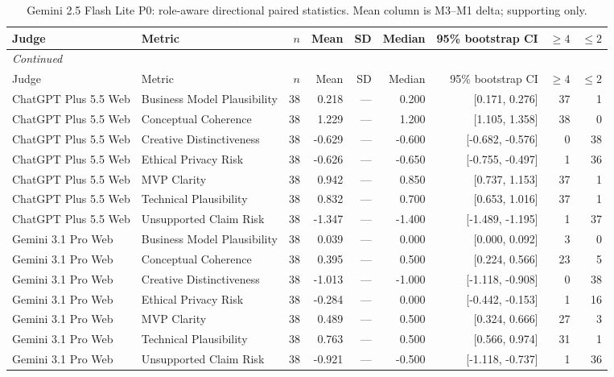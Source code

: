 \documentclass[10pt]{article}
\begin{document}
\begin{landscape}
\small
\begin{longtable}{llrrrrrrr}
\caption{Gemini 2.5 Flash Lite P0: role-aware directional paired statistics. Mean column is M3--M1 delta; supporting only.}\label{tab:s7-dir25p0}\\
\toprule
Judge & Metric & $n$ & Mean & SD & Median & 95\% bootstrap CI & $\geq4$ & $\leq2$ \\
\midrule\endfirsthead
\multicolumn{9}{l}{\small\itshape Continued}\\
\toprule Judge & Metric & $n$ & Mean & SD & Median & 95\% bootstrap CI & $\geq4$ & $\leq2$ \\ \midrule\endhead
\bottomrule\endfoot
ChatGPT Plus 5.5 Web & Business Model Plausibility & 38 & 0.218 & — & 0.200 & [0.171, 0.276] & 37 & 1 \\
ChatGPT Plus 5.5 Web & Conceptual Coherence & 38 & 1.229 & — & 1.200 & [1.105, 1.358] & 38 & 0 \\
ChatGPT Plus 5.5 Web & Creative Distinctiveness & 38 & -0.629 & — & -0.600 & [-0.682, -0.576] & 0 & 38 \\
ChatGPT Plus 5.5 Web & Ethical Privacy Risk & 38 & -0.626 & — & -0.650 & [-0.755, -0.497] & 1 & 36 \\
ChatGPT Plus 5.5 Web & MVP Clarity & 38 & 0.942 & — & 0.850 & [0.737, 1.153] & 37 & 1 \\
ChatGPT Plus 5.5 Web & Technical Plausibility & 38 & 0.832 & — & 0.700 & [0.653, 1.016] & 37 & 1 \\
ChatGPT Plus 5.5 Web & Unsupported Claim Risk & 38 & -1.347 & — & -1.400 & [-1.489, -1.195] & 1 & 37 \\
Gemini 3.1 Pro Web & Business Model Plausibility & 38 & 0.039 & — & 0.000 & [0.000, 0.092] & 3 & 0 \\
Gemini 3.1 Pro Web & Conceptual Coherence & 38 & 0.395 & — & 0.500 & [0.224, 0.566] & 23 & 5 \\
Gemini 3.1 Pro Web & Creative Distinctiveness & 38 & -1.013 & — & -1.000 & [-1.118, -0.908] & 0 & 38 \\
Gemini 3.1 Pro Web & Ethical Privacy Risk & 38 & -0.284 & — & 0.000 & [-0.442, -0.153] & 1 & 16 \\
Gemini 3.1 Pro Web & MVP Clarity & 38 & 0.489 & — & 0.500 & [0.324, 0.666] & 27 & 3 \\
Gemini 3.1 Pro Web & Technical Plausibility & 38 & 0.763 & — & 0.500 & [0.566, 0.974] & 31 & 1 \\
Gemini 3.1 Pro Web & Unsupported Claim Risk & 38 & -0.921 & — & -0.500 & [-1.118, -0.737] & 1 & 36 \\
\end{longtable}
\end{landscape}
\end{document}
